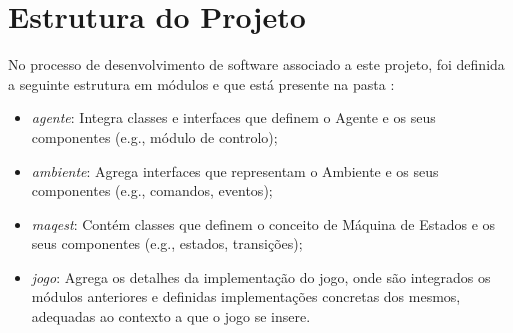 \section{Estrutura do Projeto}\label{sec:estrutura-do-projeto}

No processo de desenvolvimento de software associado a este projeto, foi definida a seguinte estrutura em módulos e que está presente na pasta :

\begin{itemize}
    \item \textit{agente}: Integra classes e interfaces que definem o Agente e os seus componentes (e.g., módulo de controlo);
    \item \textit{ambiente}: Agrega interfaces que representam o Ambiente e os seus componentes (e.g., comandos, eventos);
    \item \textit{maqest}: Contém classes que definem o conceito de Máquina de Estados e os seus componentes (e.g., estados, transições);
    \item \textit{jogo}: Agrega os detalhes da implementação do jogo, onde são integrados os módulos anteriores e definidas implementações concretas dos mesmos, adequadas ao contexto a que o jogo se insere.
\end{itemize}

